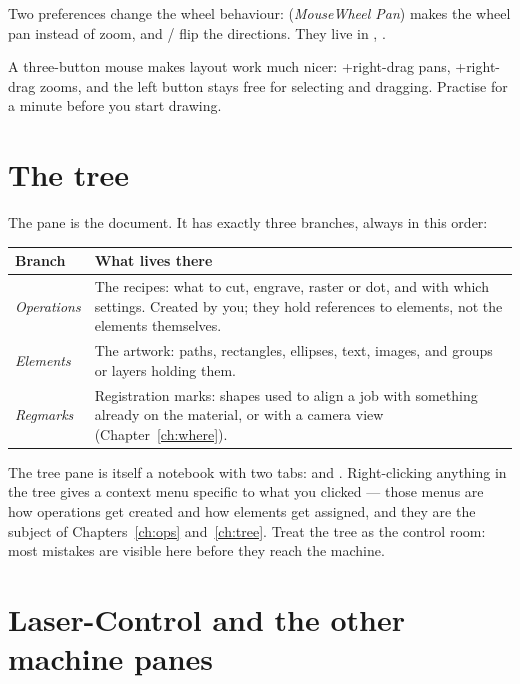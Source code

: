 \noindent Two preferences change the wheel behaviour: 
(\emph{MouseWheel Pan}) makes the wheel pan instead of zoom, and
 /  flip the directions.
They live in , .

\begin{tipbox}
A three-button mouse makes layout work much nicer: +right-drag pans,
+right-drag zooms, and the left button stays free for selecting and
dragging. Practise for a minute before you start drawing.
\end{tipbox}

\section{The tree}

The  pane is the document. It has exactly three branches, always in
this order:

\begin{center}\small
\begin{tabular}{@{}L{2.8cm}L{11.5cm}@{}}
\toprule
\textbf{Branch} & \textbf{What lives there} \\
\midrule
\emph{Operations} & The recipes: what to cut, engrave, raster or dot, and with
which settings. Created by you; they hold references to elements, not the
elements themselves. \\
\emph{Elements} & The artwork: paths, rectangles, ellipses, text, images, and
groups or layers holding them. \\
\emph{Regmarks} & Registration marks: shapes used to align a job with something
already on the material, or with a camera view (Chapter~\ref{ch:where}). \\
\bottomrule
\end{tabular}
\end{center}

\noindent The tree pane is itself a notebook with two tabs: 
and . Right-clicking anything in the tree gives a context menu
specific to what you clicked --- those menus are how operations get created and
how elements get assigned, and they are the subject of
Chapters~\ref{ch:ops} and~\ref{ch:tree}. Treat the tree as the control room:
most mistakes are visible here before they reach the machine.

\section{Laser-Control and the other machine panes}

